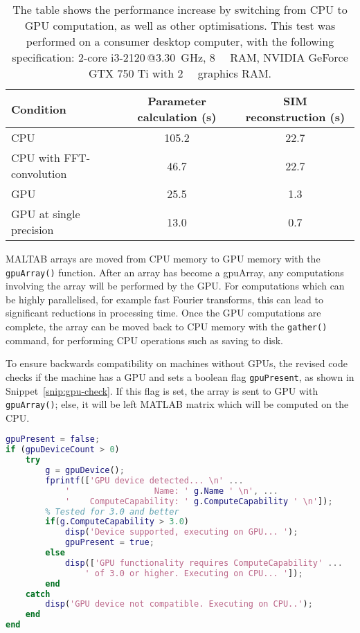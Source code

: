\begin{table}[h!]
\caption[SROS-SIM reconstruction is 32X faster on the GPU than the CPU]{\label{tab:reconPerformance}The table shows the performance increase by switching from CPU to GPU computation, as well as other optimisations. This test was performed on a consumer desktop computer, with the following specification: 2-core i3-2120\,@\SI{3.30}{\giga\hertz}, \SI{8}{\giga\byte} RAM, NVIDIA GeForce GTX 750 Ti with \SI{2}{\giga\byte} graphics RAM.}
\centering
\begin{tabular}{|l|c|c|}
\hline
\textbf{Condition} & \textbf{Parameter calculation (s)} & \textbf{SIM reconstruction (s)} \\ \hline
CPU & 105.2 & 22.7 \\
CPU with FFT-convolution & 46.7 & 22.7 \\
GPU & 25.5 & 1.3 \\
GPU at single precision & 13.0 & 0.7 \\
\hline

\end{tabular}
\end{table}

MALTAB arrays are moved from CPU memory to GPU memory with the \texttt{gpuArray()} function. 
After an array has become a gpuArray, any computations involving the array will be performed by the GPU. 
For computations which can be highly parallelised, for example fast Fourier transforms, this can lead to significant reductions in processing time. 
Once the GPU computations are complete, the array can be moved back to CPU memory with the \texttt{gather()} command, for performing CPU operations such as saving to disk. 

To ensure backwards compatibility on machines without GPUs, the revised code checks if the machine has a GPU and sets a boolean flag \texttt{gpuPresent}, as shown in Snippet~\ref{snip:gpu-check}. 
If this flag is set, the array is sent to GPU with \texttt{gpuArray()}; else, it will be left MATLAB matrix which will be computed on the CPU. 

\begin{lstfloat}
\begin{lstlisting}[language=matlab,caption={A check must be performed at the start of the main program to detect if a suitable graphics card is installed for GPU computation},label={snip:gpu-check},frame=single]
gpuPresent = false; 
if (gpuDeviceCount > 0) 
    try
        g = gpuDevice();
        fprintf(['GPU device detected... \n' ...
            '                 Name: ' g.Name ' \n', ...
            '    ComputeCapability: ' g.ComputeCapability ' \n']);
        % Tested for 3.0 and better
        if(g.ComputeCapability > 3.0)
            disp('Device supported, executing on GPU... '); 
            gpuPresent = true; 
        else
            disp(['GPU functionality requires ComputeCapability' ...
                ' of 3.0 or higher. Executing on CPU... ']); 
        end
    catch
        disp('GPU device not compatible. Executing on CPU..');
    end
end
\end{lstlisting}
\end{lstfloat}


